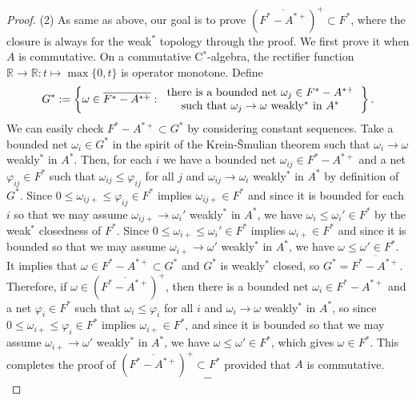 \documentclass[a4paper]{amsart}
\theoremstyle{plain}
\theoremstyle{definition}
\begin{document}
\begin{proof}
(2)
As same as above, our goal is to prove $(\overline{F^*-A^{*+}})^+\subset F^*$, where the closure is always for the weak$^*$ topology through the proof.
We first prove it when $A$ is commutative.
On a commutative C$^*$-algebra, the rectifier function $\mathbb{R}\to\mathbb{R}:t\mapsto\max\{0,t\}$ is operator monotone.
Define
\[G^*:=\left\{\omega\in\overline{F^*-A^{*+}}:\begin{tabular}{c}there is a bounded net $\omega_j\in F^*-A^{*+}$\\such that $\omega_j\to\omega$ weakly$^*$ in $A^*$\end{tabular}\right\}.\]
We can easily check $F^*-A^{*+}\subset G^*$ by considering constant sequences.
Take a bounded net $\omega_i\in G^*$ in the spirit of the Krein-\v Smulian theorem such that $\omega_i\to\omega$ weakly$^*$ in $A^*$.
Then, for each $i$ we have a bounded net $\omega_{ij}\in F^*-A^{*+}$ and a net $\varphi_{ij}\in F^*$ such that $\omega_{ij}\le\varphi_{ij}$ for all $j$ and $\omega_{ij}\to\omega_i$ weakly$^*$ in $A^*$ by definition of $G^*$.
Since $0\le\omega_{ij+}\le\varphi_{ij}\in F^*$ implies $\omega_{ij+}\in F^*$ and since it is bounded for each $i$ so that we may assume $\omega_{ij+}\to\omega_i'$ weakly$^*$ in $A^*$, we have $\omega_i\le\omega_i'\in F^*$ by the weak$^*$ closedness of $F^*$.
Since $0\le\omega_{i+}\le\omega_i'\in F^*$ implies $\omega_{i+}\in F^*$ and since it is bounded so that we may assume $\omega_{i+}\to\omega'$ weakly$^*$ in $A^*$, we have $\omega\le\omega'\in F^*$.
It implies that $\omega\in F^*-A^{*+}\subset G^*$ and $G^*$ is weakly$^*$ closed, so $G^*=\overline{F^*-A^{*+}}$.
Therefore, if $\omega\in(\overline{F^*-A^{*+}})^+$, then there is a bounded net $\omega_i\in F^*-A^{*+}$ and a net $\varphi_i\in F^*$ such that $\omega_i\le\varphi_i$ for all $i$ and $\omega_i\to\omega$ weakly$^*$ in $A^*$, so since $0\le\omega_{i+}\le\varphi_i\in F^*$ implies $\omega_{i+}\in F^*$, and since it is bounded so that we may assume $\omega_{i+}\to\omega'$ weakly$^*$ in $A^*$, we have $\omega\le\omega'\in F^*$, which gives $\omega\in F^*$.
This completes the proof of $(\overline{F^*-A^{*+}})^+\subset F^*$ provided that $A$ is commutative.
\[-\]


\end{proof}
\end{document}
